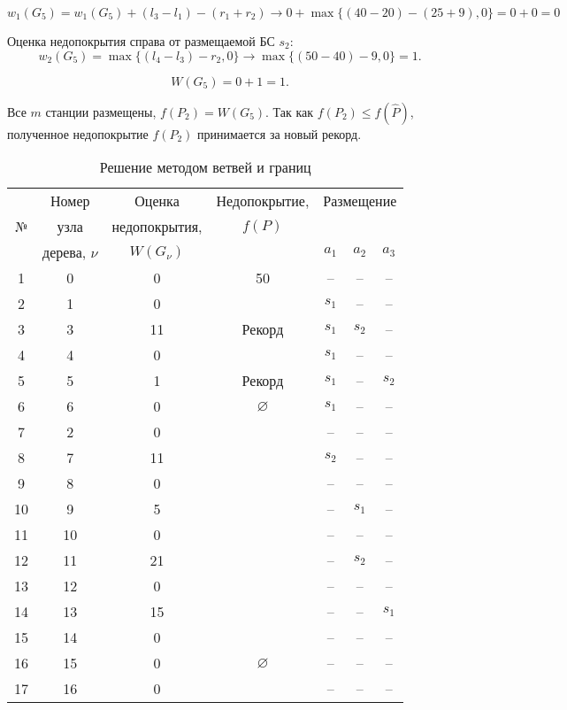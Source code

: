 $$
w_1(G_5) =  w_1(G_5) + (l_3 - l_1) - (r_1 + r_2) \rightarrow 0 + \max\{(40 - 20) - (25+ 9), 0\} = 0 + 0 = 0
$$

Оценка недопокрытия справа от размещаемой БС $s_2$: 
$$
w_2(G_5) = \max\{(l_4 - l_3) - r_2, 0\} \rightarrow \max\{(50 - 40) - 9, 0\} = 1.
$$

$$
W(G_5) = 0 + 1 = 1.
$$

Все $m$ станции размещены, $f(P_2) = W(G_5)$. Так как $f(P_2) \leqslant f(\widehat{P})$, полученное недопокрытие $f(P_2)$ принимается за новый рекорд.


\begin{table}[h!]\centering
  \begin{tabular}{| c | c | c | c | c  c c|}
  
  \hline
  \multirow{3}{*}{№}& Номер & Оценка & Недопокрытие, &  \multicolumn{3}{c|}{Размещение} \\

  &узла & недопокрытия,& $f(P)$ & &	&	\\ \cline{5-7}
  &дерева, $\nu$ &$W(G_\nu)$& & $a_1$&	$a_2$&	$a_3$\\
  \hline
  1&0 &0&50 & --&	--&	--\\
  2&1 &0& & $s_1$ &	--&	--\\
  3&3 &11& Рекорд & $s_1$ &	$s_2$&	--\\
  4&4 &0&  & $s_1$ &	--&	-- \\
  5&5 &1& Рекорд & $s_1$ &	--&	$s_2$ \\
  6&6 & 0& $\varnothing$& $s_1$ &	--&	-- \\
  7&2 &0& & --&	--&	--\\
  8&7 &11& & $s_2$&	--&	--\\
  9&8 &0& & --&	--&	--\\
  10&9 &5& & --&	$s_1$&	--\\
  11&10 &0& & --&	--&	--\\
  12&11 &21& & --&	$s_2$&	--\\
  13&12 &0& & --&	--&	--\\
  14&13 &15& & --&	--&	$s_1$\\
  15&14 &0& & --&	--&	--\\
  16&15 &0& $\varnothing$& --&	--&	--\\
  17&16 &0& & --&	--&	--\\

  \hline
\end{tabular}\caption{Решение методом ветвей и границ}\label{part4:branch_and_bound_solution}
\end{table}


